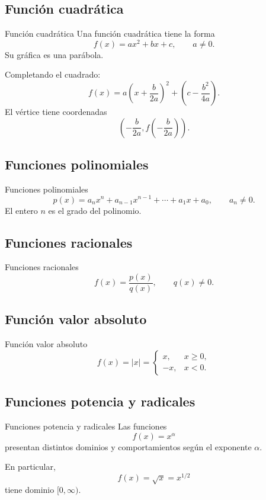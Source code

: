 \documentclass[aspectratio=169,10pt]{beamer}
\begin{document}
\subsection*{Función cuadrática}
\begin{frame}{Función cuadrática}
Una función cuadrática tiene la forma
\[
f(x)=ax^2+bx+c,\qquad a\neq0.
\]
Su gráfica es una parábola.

Completando el cuadrado:
\[
f(x)
=a\left(x+\frac{b}{2a}\right)^2
+\left(c-\frac{b^2}{4a}\right).
\]
El vértice tiene coordenadas
\[
\left(
-\frac{b}{2a},
f\left(-\frac{b}{2a}\right)
\right).
\]
\end{frame}
\subsection*{Funciones polinomiales}
\begin{frame}{Funciones polinomiales}
\[
p(x)=a_nx^n+a_{n-1}x^{n-1}+\cdots+a_1x+a_0,
\qquad a_n\neq0.
\]
El entero $n$ es el grado del polinomio.
\end{frame}
\subsection*{Funciones racionales}
\begin{frame}{Funciones racionales}
\[
f(x)=\frac{p(x)}{q(x)},\qquad q(x)\neq0.
\]
\end{frame}
\subsection*{Función valor absoluto}
\begin{frame}{Función valor absoluto}
\[
f(x)=|x|=
\begin{cases}
x,&x\geq0,\\
-x,&x<0.
\end{cases}
\]
\end{frame}
\subsection*{Funciones potencia y radicales}
\begin{frame}{Funciones potencia y radicales}
Las funciones
\[
f(x)=x^\alpha
\]
presentan distintos dominios y comportamientos según el exponente $\alpha$.

En particular,
\[
f(x)=\sqrt{x}=x^{1/2}
\]
tiene dominio $[0,\infty)$.
\end{frame}
\end{document}
